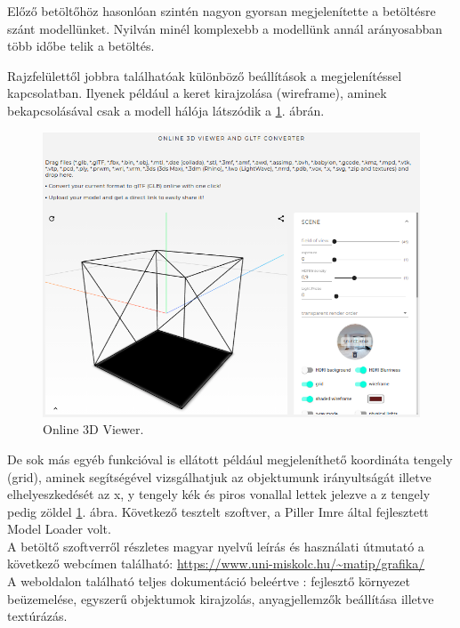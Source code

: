 Előző betöltőhöz hasonlóan szintén nagyon gyorsan megjelenítette a betöltésre szánt modellünket. Nyilván minél komplexebb a modellünk annál arányosabban több időbe telik a betöltés.

\newpage
Rajzfelülettől jobbra találhatóak különböző beállítások a megjelenítéssel kapcsolatban. Ilyenek például a keret kirajzolása (wireframe), aminek bekapcsolásával csak a modell hálója látszódik a \ref{fig:3d3}. ábrán.
\begin{figure}[h]
\bigskip
\centering
\includegraphics[width=\textwidth]{images/3D_creators_4.png}
\caption{Online 3D Viewer.}
\label{fig:3d3}
\end{figure}
\bigskip

De sok más egyéb funkcióval is ellátott például megjeleníthető koordináta tengely (grid), aminek segítségével vizsgálhatjuk az objektumunk irányultságát illetve elhelyeszkedését az x, y tengely kék és piros vonallal lettek jelezve a z tengely pedig zöldel  \ref{fig:3d3}. ábra.
\newpage
{}
Következő tesztelt szoftver, a Piller Imre által fejlesztett Model Loader volt.\cite{imre2020model}\\

\noindent A betöltő szoftverről részletes magyar nyelvű leírás és használati útmutató a következő webcímen található: \url{https://www.uni-miskolc.hu/~matip/grafika/}\\

A weboldalon található teljes dokumentáció beleértve : fejlesztő környezet beüzemelése, egyszerű objektumok kirajzolás, anyagjellemzők beállítása illetve textúrázás.\\

